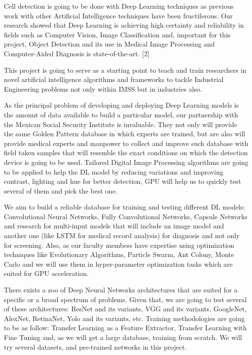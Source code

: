 Cell detection is going to be done with Deep Learning techniques as previous
work with other Artificial Intelligence techniques have been fructiferous. Our
research showed that Deep Learning is achieving high certainty and reliability
in fields such as Computer Vision, Image Classification and, important for this
project, Object Detection and its use in Medical Image Processing and
Computer-Aided Diagnosis is state-of-the-art. [2]

This project is going to serve as a starting point to teach and train
researchers in novel artificial intelligence algorithms and frameworks to tackle
Industrial Engineering problems not only within IMSS but in industries also. 

As the principal problem of developing and deploying Deep Learning models is the
amount of data available to build a particular model, our partnership with the
Mexican Social Security Institute is invaluable. They not only will provide the
same Golden Pattern database in which experts are trained, but are also will
provide medical experts and manpower to collect and improve such database with
field taken samples that will resemble the exact conditions on which the
detection device is going to be used. Tailored Digital Image Processing
algorithms are going to be applied to help the DL model by reducing variations
and improving contrast, lighting and hue for better detection, GPU will help us
to quickly test several of them and pick the best one. 

We aim to build a reliable database for training and testing different DL
models: Convolutional Neural Networks, Fully Convolutional Networks, Capsule
Networks and research for multi-input models that will include an image model
and another one (like LSTM for medical record analysis) for diagnosis and not
only for screening. Also, as our faculty members have expertise using
optimization techniques like Evolutionary Algorithms, Particle Swarm, Ant
Colony, Monte Carlo and we will use them in hyper-parameter optimization tasks
which are suited for GPU acceleration.

There exists a zoo of Deep Neural Networks architectures that are suited for a
specific or a broad spectrum of problems. Given that, we are going to test
several of these architectures: ResNet and its variants, VGG and its variants,
GoogleNet, AlexNet, RetinaNet, Yolo and its variants, etc. Training
methodologies are going to be as follow: Transfer Learning as a Feature
Extractor, Transfer Learning with Fine Tuning and, as we will get a large
database, training from scratch. We will try several datasets, and pre-trained
networks in this project. 


